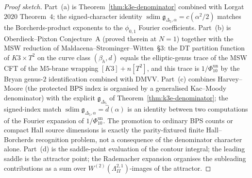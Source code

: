 \begin{proof}[Proof sketch]
Part~(a) is Theorem~\ref{thm:k3e-denominator} combined with Lorgat $2020$ Theorem~$4$; the signed-character identity \(\operatorname{sdim}\mathfrak g_{\Delta_5,\alpha}=c(\alpha^{2}/2)\) matches the Borcherds-product exponents to the $\phi_{0,1}$ Fourier coefficients. Part~(b) is Oberdieck--Pixton Conjecture~A (proved therein at $N = 1$) together with the MSW reduction of Maldacena--Strominger--Witten~\S$3$: the DT partition function of $K3\times T^{2}$ on the curve class $(\beta_{h}, d)$ equals the elliptic-genus trace of the MSW CFT of the M$5$-brane wrapping $[K3] + n[T^{2}]$, and this trace is \(1/\Phi_{10}^{\mathrm{un}}\) by the Bryan genus-$2$ identification combined with DMVV. Part~(c) combines Harvey--Moore (the protected BPS index is organised by a generalised Kac--Moody denominator) with the explicit $\mathfrak{g}_{\Delta_5}$ of Theorem~\ref{thm:k3e-denominator}; the signed-index match \(\operatorname{sdim}\mathfrak g_{\Delta_5,\alpha}=\widehat{d}(\alpha)\) is an identity between two computations of the Fourier expansion of \(1/\Phi_{10}^{\mathrm{un}}\). The promotion to ordinary BPS counts or compact Hall source dimensions is exactly the parity-fixtured finite Hall--Borcherds recognition problem, not a consequence of the denominator character alone. Part~(d) is the saddle-point evaluation of the contour integral; the leading saddle is the attractor point; the Rademacher expansion organises the subleading contributions as a sum over $W^{(2)}(\Lambda^{2,1}_{II})$-images of the attractor.
\end{proof}

